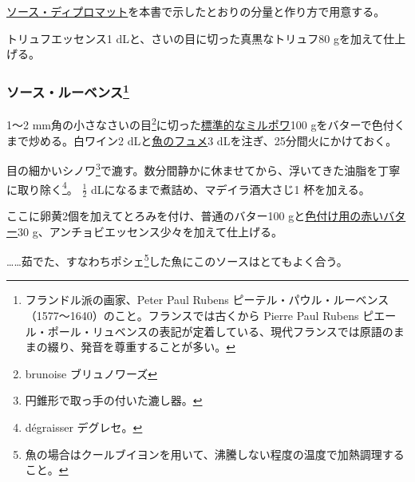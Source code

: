 \begin{recette}

 
 

\protect\hyperlink{sauce-diplomate}{ソース・ディプロマット}を本書で示したとおりの分量と作り方で用意する。

トリュフエッセンス1 dLと、さいの目に切った真黒なトリュフ80
gを加えて仕上げる。

\atoaki{}

\hypertarget{sauce-rubens}{%
\subsubsection[ソース・ルーベンス]{\texorpdfstring{ソース・ルーベンス\footnote{フランドル派の画家、Peter
  Paul Rubens
  ピーテル・パウル・ルーベンス（1577〜1640）のこと。フランスでは古くから
  Pierre Paul Rubens
  ピエール・ポール・リュベンスの表記が定着している、現代フランスでは原語のままの綴り、発音を尊重することが多い。}}{ソース・ルーベンス}}\label{sauce-rubens}}


 

1〜2 mm角の小さなさいの目\footnote{brunoise ブリュノワーズ}に切った\protect\hyperlink{}{標準的なミルポワ}100
gをバターで色付くまで炒める。白ワイン2
dLと\protect\hyperlink{fumet-de-poisson}{魚のフュメ}3
dLを注ぎ、25分間火にかけておく。

目の細かいシノワ\footnote{円錐形で取っ手の付いた漉し器。}で漉す。数分間静かに休ませてから、浮いてきた油脂を丁寧に取り除く\footnote{dégraisser
  デグレセ。}。 \(\frac{1}{2}\) dLになるまで煮詰め、マデイラ酒大さじ1
杯を加える。

ここに卵黄2個を加えてとろみを付け、普通のバター100
gと\protect\hyperlink{beurre-colorant-rouge}{色付け用の赤いバター}30
g、アンチョビエッセンス少々を加えて仕上げる。

\ldots{}\ldots{}茹でた、すなわちポシェ\footnote{魚の場合はクールブイヨンを用いて、沸騰しない程度の温度で加熱調理すること。}した魚にこのソースはとてもよく合う。

\atoaki{}

\hypertarget{sauce-saint-malo}{%
}
\end{recette}
